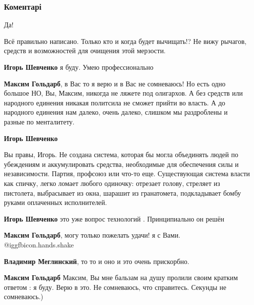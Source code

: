  
 
 
 
 
\subsubsection{Коментарі}
\label{sec:22_09_2021.fb.goldarb_maksim.1.ukraina_maidan_chistka.cmt}

\begin{itemize} %
Да!

Всё правильно написано. Только кто и когда будет вычищать!? Не вижу рычагов, средств и возможностей для очищения этой мерзости.

\begin{itemize} %
\textbf{Игорь Шевченко} я буду. Умею профессионально

\textbf{Максим Гольдарб}, в Вас то я верю и в Вас не сомневаюсь! Но есть одно большое НО, Вы, Максим, никогда не ляжете под олигархов. А без средств или народного единения никакая политсила не сможет прийти во власть. А до народного единения нам далеко, очень далеко, слишком мы раздроблены и разные по менталитету.

\textbf{Игорь Шевченко} 

Вы правы, Игорь. Не создана система, которая бы могла объединять людей по
убеждениям и аккумулировать средства, необходимые для обеспечения силы и
независимости. Партия, профсоюз или что-то еще. Существующая система власти как
спичку, легко ломает любого одиночку: отрезает голову, стреляет из пистолета,
выбрасывает из окна, шарашит из гранатомета, подкладывает бомбу руками
оплаченных исполнителей.

\textbf{Игорь Шевченко} это уже вопрос технологий . Принципиально он решён

\textbf{Максим Гольдарб}, могу только пожелать удачи! я с Вами. @igg{fbicon.hands.shake} 

\textbf{Владимир Меглинский}, то то и оно и это очень прискорбно.

\textbf{Максим Гольдарб} Максим, Вы мне бальзам на душу пролили своим кратким ответом : я буду. Верю в это. Не сомневаюсь, что справитесь. Секунды не сомневаюсь.)


\end{itemize}
\end{itemize}
